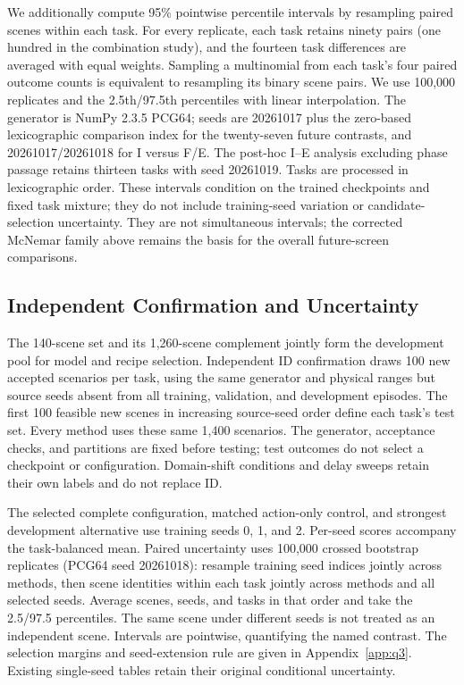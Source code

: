 We additionally compute 95\% pointwise percentile intervals by resampling paired
scenes within each task. For every replicate, each task retains ninety pairs
(one hundred in the combination study), and the fourteen task differences are
averaged with equal weights. Sampling a multinomial from each task's four
paired outcome counts is equivalent to resampling its binary scene pairs.
We use 100,000 replicates and the 2.5th/97.5th percentiles with linear interpolation.
The generator is NumPy 2.3.5 PCG64; seeds are 20261017 plus the zero-based
lexicographic comparison index for the twenty-seven future contrasts,
and 20261017/20261018 for I versus F/E. The post-hoc I--E analysis excluding
phase passage retains thirteen tasks with seed 20261019.
Tasks are processed in lexicographic order.
These intervals condition on the trained checkpoints and fixed task mixture;
they do not include training-seed variation or candidate-selection uncertainty.
They are not simultaneous intervals; the corrected McNemar family above
remains the basis for the overall future-screen comparisons.

\subsection{Independent Confirmation and Uncertainty}
\label{app:confirmation_protocol}
The 140-scene set and its 1,260-scene complement jointly form the development
pool for model and recipe selection. Independent ID confirmation draws
100 new accepted scenarios per task, using the same generator and physical
ranges but source seeds absent from all training, validation, and development
episodes. The first 100 feasible new scenes in increasing source-seed order
define each task's test set. Every method uses these same 1,400 scenarios.
The generator, acceptance checks, and partitions are fixed before testing;
test outcomes do not select a checkpoint or configuration. Domain-shift
conditions and delay sweeps retain their own labels and do not replace ID.

The selected complete configuration, matched action-only control, and
strongest development alternative use training seeds 0, 1, and 2.
Per-seed scores accompany the task-balanced mean. Paired uncertainty uses
100,000 crossed bootstrap replicates (PCG64 seed 20261018): resample training
seed indices jointly across methods, then scene identities within each
task jointly across methods and all selected seeds. Average scenes, seeds,
and tasks in that order and take the 2.5/97.5 percentiles. The same scene
under different seeds is not treated as an independent scene. Intervals
are pointwise, quantifying the named contrast. The selection margins and
seed-extension rule are given in Appendix~\ref{app:q3}. Existing single-seed
tables retain their original conditional uncertainty.

